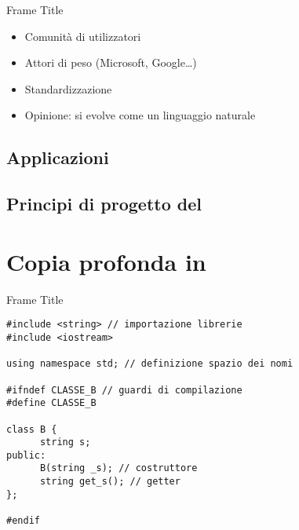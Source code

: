 \documentclass[12pt]{beamer}
\begin{document}



\begin{frame}{Frame Title}
    \begin{itemize}[<+- | alert@+>]
        \item Comunità di utilizzatori
        \item Attori di peso (Microsoft, Google\dots)
        \item Standardizzazione
        \item Opinione: si evolve come un linguaggio naturale
    \end{itemize}
\end{frame}

\subsection{Applicazioni}

\subsection{Principi di progetto del \cplusplus}

\section{Copia profonda in \cplusplus}

\begin{frame}[fragile]{Frame Title}
            \begin{verbatim}
#include <string> // importazione librerie
#include <iostream>

using namespace std; // definizione spazio dei nomi

#ifndef CLASSE_B // guardi di compilazione
#define CLASSE_B

class B {
      string s;
public:
      B(string _s); // costruttore
      string get_s(); // getter
};

#endif
            \end{verbatim}
\end{frame}
\end{document}
